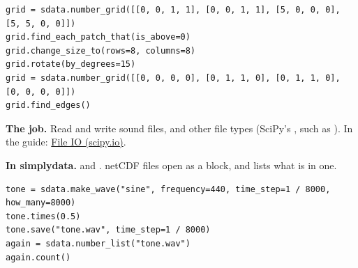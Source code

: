 \begin{lstlisting}[style=py]
grid = sdata.number_grid([[0, 0, 1, 1], [0, 0, 1, 1], [5, 0, 0, 0], [5, 5, 0, 0]])
grid.find_each_patch_that(is_above=0)
grid.change_size_to(rows=8, columns=8)
grid.rotate(by_degrees=15)
grid = sdata.number_grid([[0, 0, 0, 0], [0, 1, 1, 0], [0, 1, 1, 0], [0, 0, 0, 0]])
grid.find_edges()
\end{lstlisting}


\textbf{The job.} Read and write sound files, and other file types (SciPy's , such as
). In the guide: \href{https://docs.scipy.org/doc/scipy/tutorial/io.html}{File IO
(scipy.io)}.

\textbf{In simplydata.}  and
. netCDF files open as a block, and
 lists what is in one.

\begin{lstlisting}[style=py]
tone = sdata.make_wave("sine", frequency=440, time_step=1 / 8000, how_many=8000)
tone.times(0.5)
tone.save("tone.wav", time_step=1 / 8000)
again = sdata.number_list("tone.wav")
again.count()
\end{lstlisting}


